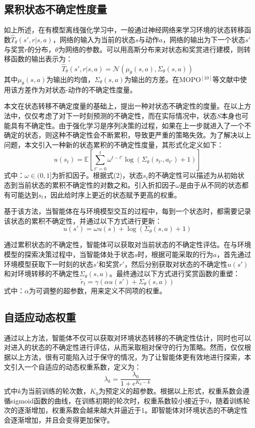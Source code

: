 \documentclass{article}
\begin{document}
\subsection{累积状态不确定性度量}
如上所述，在有模型离线强化学习中，一般通过神经网络来学习环境的状态转移函数$\hat{T}_{\theta}(s', r | s, a)$，网络的输入为当前的状态$s$与动作$a$，网络的输出为下一个状态$s'$与奖赏$r$的分布，$\theta$为网络的参数。可以用高斯分布来对状态和奖赏进行建模，则转移函数的输出表示为：
\[
  \hat{T}_{\theta}(s', r | s, a) = \mathcal{N}\left( \mu_{\theta}(s, a), \Sigma_{\theta}(s, a) \right)
\]
其中$\mu_{\theta}(s, a)$为输出的均值，$\Sigma_{\theta}(s, a)$为输出的方差。在MOPO$^{[10]}$等文献中使用该方差作为对状态-动作的不确定性度量。

本文在状态转移不确定度量的基础上，提出一种对状态不确定性的度量。在以上方法中，仅仅考虑了对下一时刻预测的不确定性，而在实际情况中，状态$S$本身也可能具有不确定性。由于强化学习是序列决策的过程，如果在上一步就进入了一个不确定的状态，则这种不确定性会不断累积，导致更严重的策略失效。为了解决以上问题，本文引入一种新的状态累积的不确定性度量，其形式化定义如下：
\[
  u\left(s_{t}\right) = \mathbb{E}\left[ \sum_{t'=0}^{t} \omega^{t-t'} \log \left( \Sigma_{\theta}\left(s_{t'}, a_{t'}\right) + 1 \right) \right] \tag{2}
\]
式中：$\omega \in (0,1]$为折扣因子。根据式(2)，状态$s_t$的不确定性可以描述为从初始状态到当前状态的累积不确定性的对数之和。引入折扣因子$\omega$是由于从不同的状态都有可能达到$s_t$，因此给时序上更近的状态赋予更高的权重。

基于该方法，当智能体在与环境模型交互的过程中，每到一个状态时，都需要记录该状态的累积不确定性，并通过以下方式进行更新：
\[
  u\left(s'\right) = \omega u(s) + \log \left( \Sigma_{\theta}(s, a) + 1 \right) \tag{3}
\]

通过累积状态的不确定性，智能体可以获取对当前状态的不确定性评估。在与环境模型的探索决策过程中，当智能体处于状态$s$时，根据可能采取的行为$a$，首先通过环境模型获取下一时刻的状态$s'$和奖赏$r'$，然后分别获取对状态的不确定性$u(s')$和对环境转移的不确定性$\Sigma_{\theta}(s, a)$。最终通过以下方式进行奖赏函数的重塑：
\[
  \tilde{r}_{t} = \gamma \left( \alpha u\left(s'\right) + \Sigma_{\theta}(s, a) \right) \tag{4}
\]
式中：$\alpha$为可调整的超参数，用来定义不同项的权重。

\subsection{自适应动态权重}
通过以上方法，智能体不仅可以获取对环境状态转移的不确定性估计，同时也可以对进入的状态的不确定性进行评估，从而采取相对保守的行为策略。然而，仅仅根据以上方法，很有可能陷入过于保守的情况，为了让智能体更有效地进行探索，本文引入一个自适应的动态权重系数，定义为：
\[
  \lambda_{k} = \frac{\lambda_{0}}{1+e^{K_{0}-k}} \tag{5}
\]
式中$k$为当前训练的轮次数，$K_{0}$为预定义的超参数。根据以上形式，权重系数会遵循sigmoid函数的曲线，在训练初期的轮次时，权重系数较小接近于0，随着训练轮次的逐渐增加，权重系数会越来越大并逼近于1。即智能体对环境状态的不确定性会逐渐增加，并且会变得更加保守。
\end{document}

